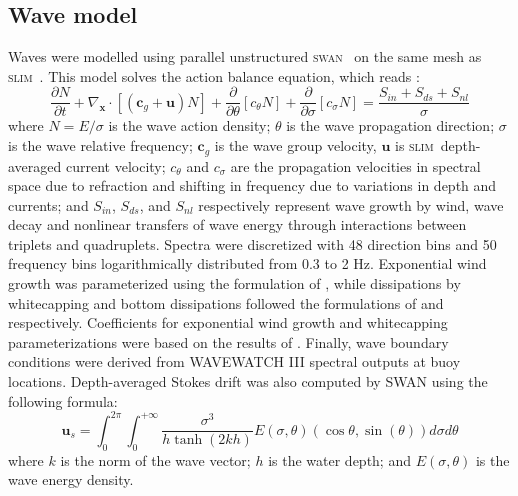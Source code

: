 \documentclass[11pt,a4paper]{article}
\newcommand{\slim}{\textsc{slim}\ }
\newcommand{\swan}{\textsc{swan}\ }
\begin{document}
\subsection{Wave model}
Waves were modelled using parallel unstructured \swan \citep{booij1999third} on the same mesh as \slim. This model solves the action balance equation, which reads \citep{mei1989applied}:
\begin{equation}
    \dfrac{\partial N}{\partial t} + \nabla_\mathbf{x}\cdot[(\mathbf{c}_g+\mathbf{u})N] + \dfrac{\partial }{\partial \theta}[c_\theta N] + \dfrac{\partial}{\partial \sigma}[c_\sigma N] = \dfrac{S_{in}+S_{ds}+S_{nl}}{\sigma} \label{eq:swan}
\end{equation}
where $N=E/\sigma$ is the wave action density; $\theta$ is the wave propagation direction; $\sigma$ is the wave relative frequency; $\mathbf{c}_g$ is the wave group velocity, $\mathbf{u}$ is \slim depth-averaged current velocity; $c_\theta$ and $c_\sigma$ are the propagation velocities in spectral space due to refraction and shifting in frequency due to variations in depth and currents; and $S_{in}$, $S_{ds}$, and $S_{nl}$ respectively represent wave growth by wind, wave decay and nonlinear transfers of wave energy through interactions between triplets and quadruplets. Spectra were discretized with 48 direction bins and 50 frequency bins logarithmically distributed from 0.3 to 2 Hz. Exponential wind growth was parameterized using the formulation of \cite{janssen1991quasi}, while dissipations by whitecapping and bottom dissipations followed the formulations of \cite{komen1984existence} and \cite{madsen1989spectral} respectively. Coefficients for exponential wind growth and whitecapping parameterizations were based on the results of \cite{siadatmousavi2011evaluation}. Finally, wave boundary conditions were derived from WAVEWATCH III \citep{tolman2009user} spectral outputs at buoy locations. Depth-averaged Stokes drift was also computed by SWAN using the following formula:
\begin{equation}
    \mathbf{u}_{s} = \int_0^{2\pi}\int_0^{+\infty} \dfrac{\sigma^3}{h\tanh(2kh)}E(\sigma,\theta)(\cos\theta, \sin(\theta))d\sigma d\theta
\end{equation}
where $k$ is the norm of the wave vector; $h$ is the water depth; and $E(\sigma,\theta)$ is the wave energy density.
\end{document}
